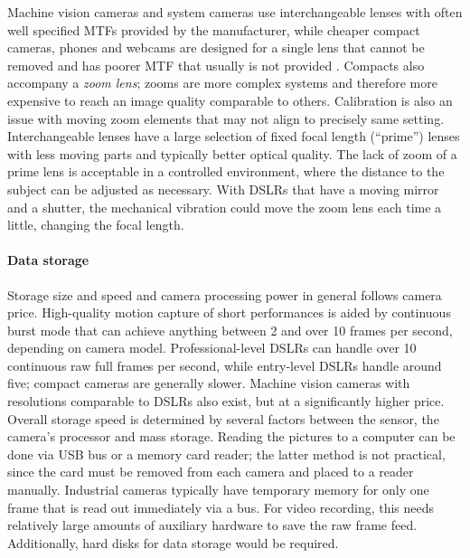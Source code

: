Machine vision cameras and system cameras use interchangeable lenses with often well specified MTFs provided by the manufacturer, while cheaper compact cameras, phones and webcams are designed for a single lens that cannot be removed and has poorer MTF that usually is not provided \cite{sick2006machine}.
Compacts also accompany a \emph{zoom lens}; zooms are more complex systems and therefore more expensive to reach an image quality comparable to others.
Calibration is also an issue with moving zoom elements that may not align to precisely same setting.
Interchangeable lenses have a large selection of fixed focal length (``prime'') lenses with less moving parts and typically better optical quality.
The lack of zoom of a prime lens is acceptable in a controlled environment, where the distance to the subject can be adjusted as necessary.
With DSLRs that have a moving mirror and a shutter, the mechanical vibration could move the zoom lens each time a little, changing the focal length.


\paragraph{Data storage}
Storage size and speed and camera processing power in general follows camera price.
High-quality motion capture of short performances is aided by continuous burst mode that can achieve anything between 2 and over 10 frames per second, depending on camera model.
Professional-level DSLRs can handle over 10 continuous raw full frames per second, while entry-level DSLRs handle around five;
compact cameras are generally slower.
Machine vision cameras with resolutions comparable to DSLRs also exist, but at a significantly higher price.
Overall storage speed is determined by several factors between the sensor, the camera's processor and mass storage.
Reading the pictures to a computer can be done via USB bus or a memory card reader; the latter method is not practical, since the card must be removed from each camera and placed to a reader manually.
Industrial cameras typically have temporary memory for only one frame that is read out immediately via a bus.
For video recording, this needs relatively large amounts of auxiliary hardware to save the raw frame feed.
Additionally, hard disks for data storage would be required.

